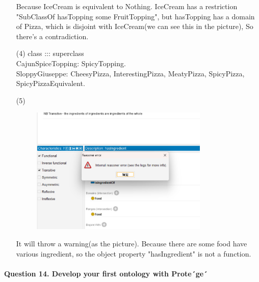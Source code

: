 \documentclass[12pt]{article}
\begin{document}
\begin{enumerate}
\begin{figure}[h]
			\label{fig:roc}
			\end{figure}
        Because IceCream is equivalent to Nothing. IceCream has a restriction "SubClassOf hasTopping some FruitTopping", but hasTopping
        has a domain of Pizza, which is disjoint with IceCream(we can see this in the picture), So there's a contradiction.
        \item[(4)]
        class ::: superclass \\
        CajunSpiceTopping: SpicyTopping. \\
        SloppyGiuseppe: CheesyPizza, InterestingPizza, MeatyPizza, SpicyPizza, SpicyPizzaEquivalent. \\
        \item[(5)]
        \begin{figure}[h]
			\centering
			\includegraphics[width=0.8\textwidth]{13_5.png}\\
			\label{fig:roc}
			\end{figure}
        It will throw a warning(as the picture). Because there are some food have various ingredient, so the object property "hasIngredient" is not a function.
    \end{enumerate}

    \newpage 
    \paragraph{Question 14. Develop your first ontology with Prote´ge´}~{}
    \\
\end{document}
